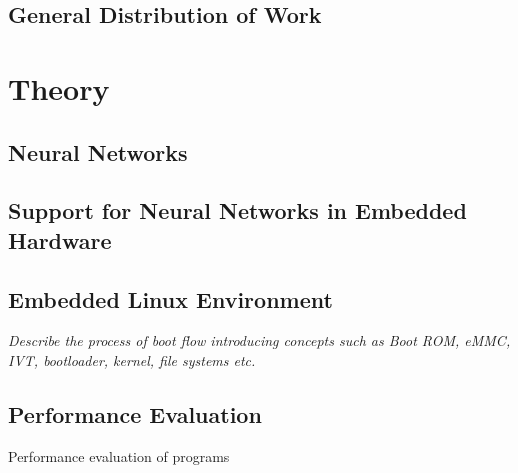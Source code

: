 \section{General Distribution of Work}

\chapter{Theory}

\section{Neural Networks}

\section{Support for Neural Networks in Embedded Hardware}

\section{Embedded Linux Environment}
\textit{Describe the process of boot flow introducing concepts such as Boot ROM, eMMC, IVT, bootloader, kernel, file systems etc.}

\section{Performance Evaluation}

Performance evaluation of programs
